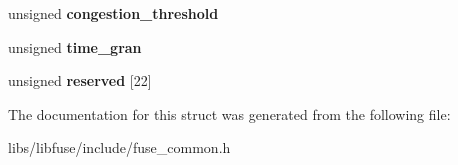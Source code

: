 \begin{DoxyCompactItemize}
\item 
unsigned {\bfseries congestion\+\_\+threshold}\hypertarget{structfuse__conn__info_a2ce707ca8bfd6f6669557db7f37bb1ad}{}\label{structfuse__conn__info_a2ce707ca8bfd6f6669557db7f37bb1ad}

\item 
unsigned {\bfseries time\+\_\+gran}\hypertarget{structfuse__conn__info_a0a72f4702cf256e4861cc2b98486d08c}{}\label{structfuse__conn__info_a0a72f4702cf256e4861cc2b98486d08c}

\item 
unsigned {\bfseries reserved} \mbox{[}22\mbox{]}\hypertarget{structfuse__conn__info_a26b74a62be5ba5b4f4cf503dbfbd5a9f}{}\label{structfuse__conn__info_a26b74a62be5ba5b4f4cf503dbfbd5a9f}

\end{DoxyCompactItemize}


The documentation for this struct was generated from the following file\+:\begin{DoxyCompactItemize}
\item 
libs/libfuse/include/fuse\+\_\+common.\+h\end{DoxyCompactItemize}
